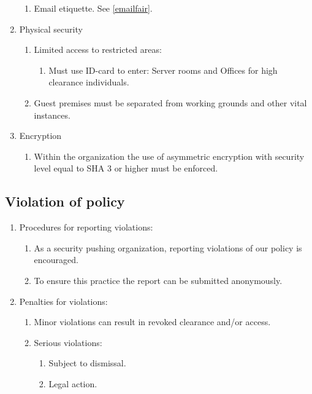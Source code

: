\begin{enumerate}
\begin{enumerate}
    \item Email etiquette. See \ref{emailfair}.
  \end{enumerate}
  \item Physical security
  \begin{enumerate}
    \item Limited access to restricted areas:
    \begin{enumerate}
      \item Must use ID-card to enter: Server rooms and Offices for high clearance individuals.
    \end{enumerate}
    \item Guest premises must be separated from working grounds and other vital instances.
  \end{enumerate}
  \item Encryption
  \begin{enumerate}
    \item Within the organization the use of asymmetric encryption with security level equal to SHA 3 or higher must be enforced.
  \end{enumerate}
\end{enumerate}

\subsection{Violation of policy}

\begin{enumerate}
  \item Procedures for reporting violations:
  \begin{enumerate}
    \item As a security pushing organization, reporting violations of our policy is encouraged.
    \item To ensure this practice the report can be submitted anonymously.
  \end{enumerate}
    \item Penalties for violations:
  \begin{enumerate}
    \item Minor violations can result in revoked clearance and/or access.
    \item Serious violations:
    \begin{enumerate}
      \item Subject to dismissal.
      \item Legal action.
    \end{enumerate}
  \end{enumerate}
\end{enumerate}

